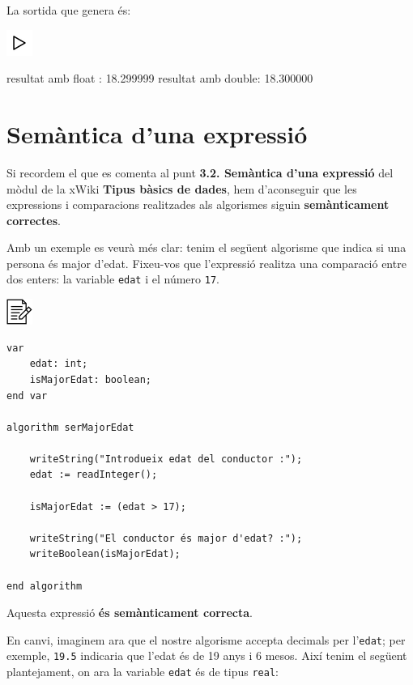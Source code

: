 \documentclass[
]{book}
\newenvironment{Shaded}{\begin{snugshade}}{\end{snugshade}}
\newcommand{\DataTypeTok}[1]{\textcolor[rgb]{0.13,0.29,0.53}{#1}}
\newcommand{\FloatTok}[1]{\textcolor[rgb]{0.00,0.00,0.81}{#1}}
\newcommand{\NormalTok}[1]{#1}
\begin{document}
La sortida que genera és:

\includegraphics{./img/play.png}

\begin{Shaded}
\begin{Highlighting}[]
\NormalTok{resultat amb }\DataTypeTok{float}\NormalTok{ : }\FloatTok{18.299999}
\NormalTok{resultat amb }\DataTypeTok{double}\NormalTok{: }\FloatTok{18.300000}
\end{Highlighting}
\end{Shaded}

\hypertarget{semuxe0ntica-duna-expressiuxf3}{%
\section{Semàntica d'una expressió}\label{semuxe0ntica-duna-expressiuxf3}}

Si recordem el que es comenta al punt \textbf{3.2. Semàntica d'una expressió} del mòdul de la xWiki \textbf{Tipus bàsics de dades}, hem d'aconseguir que les expressions i comparacions realitzades als algorismes siguin \textbf{semànticament correctes}.

Amb un exemple es veurà més clar: tenim el següent algorisme que indica si una persona és major d'edat. Fixeu-vos que l'expressió realitza una comparació entre dos enters: la variable \texttt{edat} i el número \texttt{17}.

\includegraphics{./img/alg.png}

\begin{verbatim}
var
    edat: int;
    isMajorEdat: boolean;
end var

algorithm serMajorEdat

    writeString("Introdueix edat del conductor :");
    edat := readInteger();

    isMajorEdat := (edat > 17);

    writeString("El conductor és major d'edat? :");
    writeBoolean(isMajorEdat);

end algorithm
\end{verbatim}

Aquesta expressió \textbf{és semànticament correcta}.

En canvi, imaginem ara que el nostre algorisme accepta decimals per l'\texttt{edat}; per exemple, \texttt{19.5} indicaria que l'edat és de 19 anys i 6 mesos. Així tenim el següent plantejament, on ara la variable \texttt{edat} és de tipus \texttt{real}:
\end{document}
